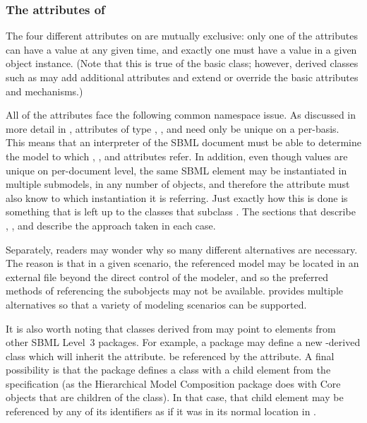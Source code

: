 \subsubsection{The attributes of }

The four different attributes on \SBaseRef are mutually exclusive: only one of the attributes can have a value at any given time, and exactly one must have a value in a given \SBaseRef object instance.  (Note that this is true of the basic \SBaseRef class; however, derived classes such as \ReplacedElement may add additional attributes and extend or override the basic attributes and mechanisms.)

All of the attributes face the following common namespace issue.  As discussed in more detail in , attributes of type , , and  need only be unique on a per-\Model basis.  This means that an interpreter of the SBML document must be able to determine the model to which , , and  attributes refer. In addition, even though  values are unique on per-document level, the same SBML element may be instantiated in multiple submodels, in any number of \Model objects, and therefore the  attribute must also know to which \Model instantiation it is referring. Just exactly how this is done is something that is left up to the classes that subclass \SBaseRef.  The sections that describe \Port, \Deletion, \ReplacedElement and \ReplacedBy describe the approach taken in each case.

Separately, readers may wonder why so many different alternatives are necessary.  The reason is that in a given scenario, the referenced model may be located in an external file beyond the direct control of the modeler, and so the preferred methods of referencing the subobjects may not be available.  \SBaseRef provides multiple alternatives so that a variety of modeling scenarios can be supported.

It is also worth noting that classes derived from \SBaseRef may point to elements from other SBML Level~3 packages.  For example, a package may define a new \SBase-derived class which will inherit the   attribute.   be referenced by the \SBaseRef {} attribute.  A final possibility is that the package defines a class with a child element from the \sbmlthreecore specification (as the Hierarchical Model Composition package does with Core \Model objects that are children of the \ListOfModelDefinitions class).  In that case, that child element may be referenced by any of its identifiers as if it was in its normal location in \sbmlthreecore.

